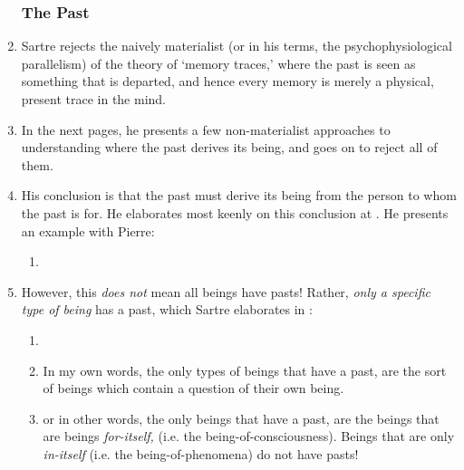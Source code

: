 \begin{enumerate}
  \subsubsection*{The Past}
  \item Sartre rejects the naively materialist (or in his terms, the psychophysiological parallelism) of the theory of `memory traces,' where the past is seen as something that is departed, and hence every memory is merely a physical, present trace in the mind.
  \item In the next pages, he presents a few non-materialist approaches to understanding where the past derives its being, and goes on to reject all of them.
  \item His conclusion is that the past must derive its being from the person to whom the past is for. He elaborates most keenly on this conclusion at \autocite[169]{sartre}. He presents an example with Pierre:
  \begin{enumerate}
    \item {}
  \end{enumerate}
  \item {} However, this \emph{does not} mean all beings have pasts! Rather, \emph{only a specific type of being} has a past, which Sartre elaborates in \autocite[172]{sartre}:
  \begin{enumerate}
    \item {}
    \item In my own words, the only types of beings that have a past, are the sort of beings which contain a question of their own being.
    \item or in other words, the only beings that have a past, are the beings that are beings \emph{for-itself,} (i.e. the being-of-consciousness). Beings that are only \emph{in-itself} (i.e. the being-of-phenomena) do not have pasts!

\end{enumerate}
\end{enumerate}
